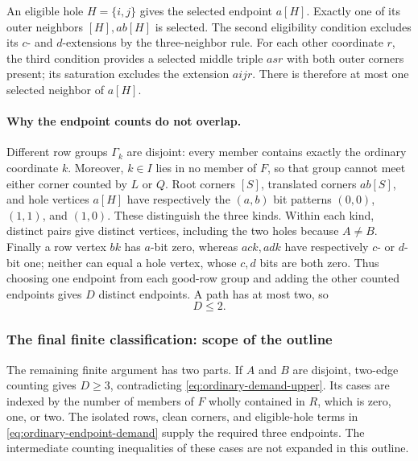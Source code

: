 \documentclass[11pt,a4paper]{article}
\theoremstyle{definition}
\theoremstyle{remark}
\begin{document}
An eligible hole $H=\{i,j\}$ gives the selected endpoint $a[H]$.
Exactly one of its outer neighbors $[H],ab[H]$ is selected. The second
eligibility condition excludes its $c$- and $d$-extensions by the
three-neighbor rule. For each other coordinate $r$, the third condition
provides a selected middle triple $asr$ with both outer corners present;
its saturation excludes the extension $aijr$. There is therefore at
most one selected neighbor of $a[H]$.

\paragraph{Why the endpoint counts do not overlap.}
Different row groups $\Gamma_k$ are disjoint: every member contains
exactly the ordinary coordinate $k$. Moreover, $k\in I$ lies in no
member of $F$, so that group cannot meet either corner counted by $L$
or $Q$. Root corners $[S]$, translated corners $ab[S]$, and hole
vertices $a[H]$ have respectively the $(a,b)$ bit patterns $(0,0)$,
$(1,1)$, and $(1,0)$. These distinguish the three kinds. Within each
kind, distinct pairs give distinct vertices, including the two holes
because $A\ne B$. Finally a row vertex $bk$ has $a$-bit zero, whereas
$ack,adk$ have respectively $c$- or $d$-bit one; neither can equal a
hole vertex, whose $c,d$ bits are both zero. Thus choosing one endpoint
from each good-row group and adding the other counted endpoints gives
$D$ distinct endpoints. A path has at most two, so
\begin{equation}\label{eq:ordinary-demand-upper}
 D\le2.
\end{equation}

\subsubsection*{The final finite classification: scope of the outline}
The remaining finite argument has two parts. If $A$ and $B$ are disjoint,
two-edge counting gives $D\ge3$, contradicting
\eqref{eq:ordinary-demand-upper}. Its cases are indexed by the number
of members of $F$ wholly contained in $R$, which is zero, one, or two.
The isolated rows, clean corners, and eligible-hole terms in
\eqref{eq:ordinary-endpoint-demand} supply the required three endpoints.
The intermediate counting inequalities of these cases are not expanded
in this outline.
\end{document}
